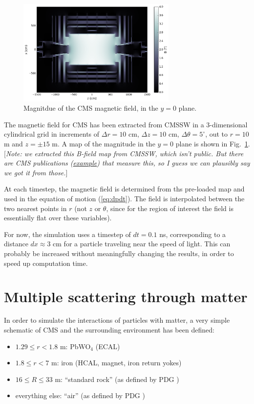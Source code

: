 \documentclass[12pt]{article}
\begin{document}
\begin{figure}
\centering
\includegraphics[width=0.7\textwidth]{plots/cms_bfield_coarse.png}
\caption{Magnitdue of the CMS magnetic field, in the $y=0$ plane.}
\label{fig:bfield}
\end{figure}

The magnetic field for CMS has been extracted from CMSSW
in a 3-dimensional cylindrical grid in increments of $\Delta r=10$ cm, $\Delta z=10$ cm, $\Delta\theta=5^\circ$, out to
$r=10$ m and $z=\pm15$ m. A map of the magnitude in the $y=0$ plane is shown in Fig.~\ref{fig:bfield}.
[\emph{Note: we extracted this B-field map from CMSSW, which isn't public. But there are CMS publications (\href{https://iopscience.iop.org/article/10.1088/1748-0221/5/03/T03021/meta}{example}) that measure
this, so I guess we can plausibly say we got it from those.}]

At each timestep, the magnetic field is determined from ths pre-loaded map and used in the equation of motion (\ref{eq:dpdt}).
The field is interpolated between the two nearest points in $r$ (not $z$ or $\theta$, since for the region of interest the field
is essentially flat over these variables).

For now, the simulation uses a timestep of $dt=0.1$ ns, corresponding to a distance $dx\approx3$ cm for a particle traveling near
the speed of light. This can probably be increased without meaningfully changing the results, in order to speed up computation time.


\section{Multiple scattering through matter}
In order to simulate the interactions of particles with matter, a very simple schematic of CMS and the surrounding environment has been defined:
\begin{itemize}
\item $1.29 \leq r < 1.8$ m: PbWO$_4$ (ECAL)
\item $1.8 \leq r < 7$ m: iron (HCAL, magnet, iron return yokes)
\item $16\leq R\leq33$ m: ``standard rock'' (as defined by PDG \cite{PDG_properties})
\item everything else: ``air'' (as defined by PDG \cite{PDG_properties})
\end{itemize}
\end{document}
